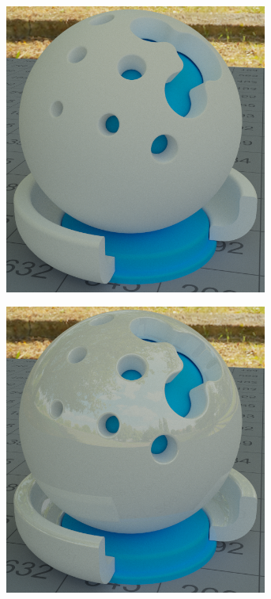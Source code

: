 		\begin{figure}
			\begin{subfigure}[b]{0.5\textwidth}
				\center
				\includegraphics[width=0.95\textwidth]{pic/shaderball-bsdf_sum-diffuse.png}
			\end{subfigure}
			\begin{subfigure}[b]{0.5\textwidth}
				\center
				\includegraphics[width=0.95\textwidth]{pic/shaderball-bsdf_sum-specular.png}

\end{subfigure}
\end{figure}
